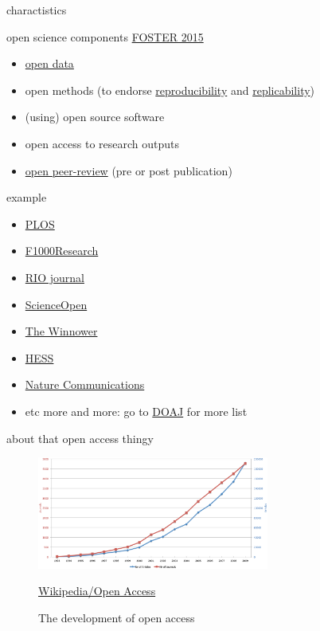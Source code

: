 \documentclass[10pt]{beamer}
\begin{document}
\begin{frame}{charactistics}
    \begin{exampleblock}{open science components \href{http://www.slideshare.net/Acceso2/introduction-to-open-science}{FOSTER 2015}}
	\begin{itemize}
    \item \href{http://opendatahandbook.org/guide/en/what-is-open-data/}{open data} 
    \item open methods (to endorse \href{https://en.wikipedia.org/wiki/Reproducibility}{reproducibility} and \href{https://publication2application.org/2014/06/09/replicability-in-research-and-practice/}{replicability})
    \item (using) open source software
    \item open access to research outputs
    \item \href{https://en.wikipedia.org/wiki/Open_peer_review}{open peer-review} (pre or post publication)
    \end{itemize}
    \end{exampleblock}
\end{frame}

\begin{frame}{example}
	\begin{itemize}
    \item \href{http://plosone.org/}{PLOS}
    \item \href{http://f1000research.com/}{F1000Research}
    \item \href{http://riojournal.com/}{RIO journal}
    \item \href{http://scienceopen.com/}{ScienceOpen}
    \item \href{http://thewinnower.com/}{The Winnower}
    \item \href{http://hydrol-earth-syst-sci-discuss.net/}{HESS}
    \item \href{http://www.nature.com/ncomms/index.html}{Nature Communications}
    \item etc more and more: go to \href{http://doaj.org/}{DOAJ} for more list
    \end{itemize}
\end{frame}


\begin{frame}{about that open access thingy}
	\begin{figure}[!ht]
  	\centering
  	\includegraphics[width=3in]{Dev_oa.png}
    \caption{The development of open access}{\href{https://en.wikipedia.org/wiki/Open_access}{Wikipedia/Open Access}}
	\end{figure}
\end{frame}
\end{document}
